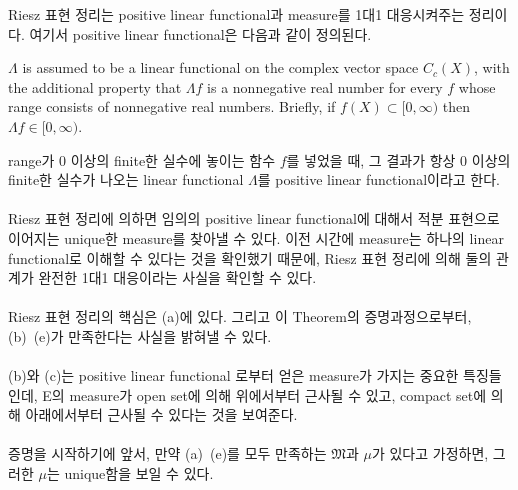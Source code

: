 \documentclass[11pt,reqno]{amsart}
\renewcommand{\(}{\left(}
\renewcommand{\)}{\right)}
\renewcommand{\[}{\left[}
\renewcommand{\]}{\right]}
\newenvironment{textbox}
  {\begin{tcolorbox}[
    colback=gray!10, 
    colframe=gray!50, 
    boxrule=0.5pt,
    fontupper=\normalfont
  ]}
  {\end{tcolorbox}}
\newcommand{\subheading}[1]{\vspace{1em}{\noindent\large\bfseries \textlangle{} #1 \textrangle{} \par}\vspace{1em}}
\newcommand{\M}{\mathfrak{M}}
\begin{document}
Riesz 표현 정리는 positive linear functional과 measure를 1대1 대응시켜주는 정리이다. 
여기서 positive linear functional은 다음과 같이 정의된다.
\begin{textbox}
  $\Lambda$ is assumed to be a linear functional on the complex vector space $C_c(X)$,
  with the additional property that $\Lambda f$ is a nonnegative 
  real number for every $f$ whose range consists of nonnegative real numbers.
  Briefly, if $f(X) \subset [0, \infty )$ then $\Lambda f \in [0, \infty)$.
\end{textbox}

range가 0 이상의 finite한 실수에 놓이는 함수 $f$를 넣었을 때, 그 결과가 항상 0 이상의 finite한 실수가 나오는
linear functional $\Lambda$를 positive linear functional이라고 한다. \\ \\
Riesz 표현 정리에 의하면 임의의 positive linear functional에 대해서 적분 표현으로 이어지는 
unique한 measure를 찾아낼 수 있다. 이전 시간에 measure는 하나의 linear functional로 이해할 수 있다는
것을 확인했기 때문에, Riesz 표현 정리에 의해 둘의 관계가 완전한 1대1 대응이라는 사실을 확인할 수 있다. \\ \\

Riesz 표현 정리의 핵심은 (a)에 있다. 그리고 이 Theorem의 증명과정으로부터, (b)~(e)가 만족한다는 사실을 밝혀낼 수 있다. \\ \\
(b)와 (c)는 positive linear functional 로부터 얻은 measure가 가지는 중요한 특징들인데, 
E의 measure가 open set에 의해 위에서부터 근사될 수 있고, compact set에 의해 아래에서부터 
근사될 수 있다는 것을 보여준다. \\ \\

증명을 시작하기에 앞서, 만약 (a)~(e)를 모두 만족하는 $\M$과 $\mu$가 있다고 가정하면, 그러한 $\mu$는 unique함을 보일 수 있다.

\subheading{proof}
\end{document}
